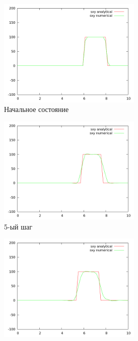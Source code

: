 \begin{figure}[H]
\begin{subfigure}[b]{0.5\textwidth}
\centering
\includegraphics[width=0.75\textwidth]{png/veryfication/0.4/s-wave-along-x0.png}
\caption{Начальное состояние}
\end{subfigure}
\begin{subfigure}[b]{0.5\textwidth}
\centering
\includegraphics[width=0.75\textwidth]{png/veryfication/0.4/s-wave-along-x5.png}
\caption{5-ый шаг}
\end{subfigure}
\begin{subfigure}[b]{0.5\textwidth}
\centering
\includegraphics[width=0.75\textwidth]{png/veryfication/0.4/s-wave-along-x10.png}

\end{subfigure}
\end{figure}
